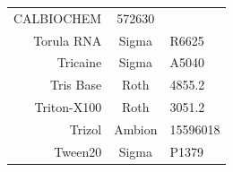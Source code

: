 \documentclass[11pt,singlespacinge,twoside]{reedthesis} %
\theoremstyle{definition}
\theoremstyle{definition}
\theoremstyle{definition}
\theoremstyle{remark}
\begin{document}
\begin{longtable}[]{@{}rcl@{}}
\begin{minipage}[t]{0.33\columnwidth}
CALBIOCHEM\strut
\end{minipage} & \begin{minipage}[t]{0.29\columnwidth}\raggedright
572630\strut
\end{minipage}\tabularnewline
\begin{minipage}[t]{0.29\columnwidth}\raggedleft
Torula RNA\strut
\end{minipage} & \begin{minipage}[t]{0.33\columnwidth}\centering
Sigma\strut
\end{minipage} & \begin{minipage}[t]{0.29\columnwidth}\raggedright
R6625\strut
\end{minipage}\tabularnewline
\begin{minipage}[t]{0.29\columnwidth}\raggedleft
Tricaine\strut
\end{minipage} & \begin{minipage}[t]{0.33\columnwidth}\centering
Sigma\strut
\end{minipage} & \begin{minipage}[t]{0.29\columnwidth}\raggedright
A5040\strut
\end{minipage}\tabularnewline
\begin{minipage}[t]{0.29\columnwidth}\raggedleft
Tris Base\strut
\end{minipage} & \begin{minipage}[t]{0.33\columnwidth}\centering
Roth\strut
\end{minipage} & \begin{minipage}[t]{0.29\columnwidth}\raggedright
4855.2\strut
\end{minipage}\tabularnewline
\begin{minipage}[t]{0.29\columnwidth}\raggedleft
Triton-X100\strut
\end{minipage} & \begin{minipage}[t]{0.33\columnwidth}\centering
Roth\strut
\end{minipage} & \begin{minipage}[t]{0.29\columnwidth}\raggedright
3051.2\strut
\end{minipage}\tabularnewline
\begin{minipage}[t]{0.29\columnwidth}\raggedleft
Trizol\strut
\end{minipage} & \begin{minipage}[t]{0.33\columnwidth}\centering
Ambion\strut
\end{minipage} & \begin{minipage}[t]{0.29\columnwidth}\raggedright
15596018\strut
\end{minipage}\tabularnewline
\begin{minipage}[t]{0.29\columnwidth}\raggedleft
Tween20\strut
\end{minipage} & \begin{minipage}[t]{0.33\columnwidth}\centering
Sigma\strut
\end{minipage} & \begin{minipage}[t]{0.29\columnwidth}\raggedright
P1379\strut
\end{minipage}\tabularnewline
\bottomrule
\end{longtable}
\end{document}
